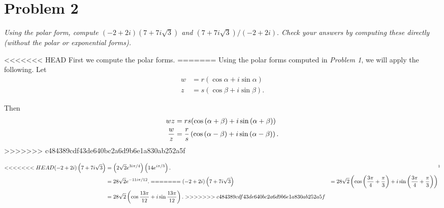 \documentclass{tufte-handout}
\begin{document}
\section{Problem 2}
\begin{description}
\item \textit{Using the polar form, compute $(-2+2i)(7 + 7i\sqrt{3})$
    and $(7 + 7i\sqrt{3})/(-2 + 2i).$ Check your answers by computing
    these directly (without the polar or exponential forms).}
\end{description}

<<<<<<< HEAD
First we compute the polar forms.
=======
Using the polar forms computed in \textit{Problem 1}, we will apply
the following. Let
\begin{align*}
  w &= r(\cos \alpha + i \sin \alpha)\\
  z &= s(\cos \beta + i \sin \beta).
\end{align*}

Then
\begin{align*}
  wz &= rs(\cos{(\alpha + \beta)} + i \sin{(\alpha + \beta)})\\
  {w \over z} &= {r \over s} \left( \cos{ (\alpha - \beta)} + i \sin{
                (\alpha - \beta)}\right).
\end{align*}
>>>>>>> c484389cdf43de640bc2a6d9b6e1a830ab252a5f

\begin{align*}
<<<<<<< HEAD
  (-2 + 2i)\left(7 + 7i\sqrt 3\right) &= \left(2 \sqrt 2 e^{3i \pi /
                                        4}\right)\left(14e^{i\pi /
                                        3}\right). && \footnotemark \\
                                      &= 28 \sqrt 2 e^{-11i\pi / 12}.
=======
  (-2 + 2i)\left(7 + 7i\sqrt 3\right) &= 28 \sqrt 2 \left( \cos{
                                        \left( {3 \pi \over 4} + {\pi
                                        \over 3}\right)} + i \sin{
                                        \left( {3 \pi \over 4} + {\pi
                                        \over 3}\right)}\right)\\
                                      &= 28 \sqrt 2 \left( \cos{ 13
                                        \pi \over 12} + i \sin{ 13 \pi
                                        \over 12}\right).
>>>>>>> c484389cdf43de640bc2a6d9b6e1a830ab252a5f
\end{align*}
\end{document}

